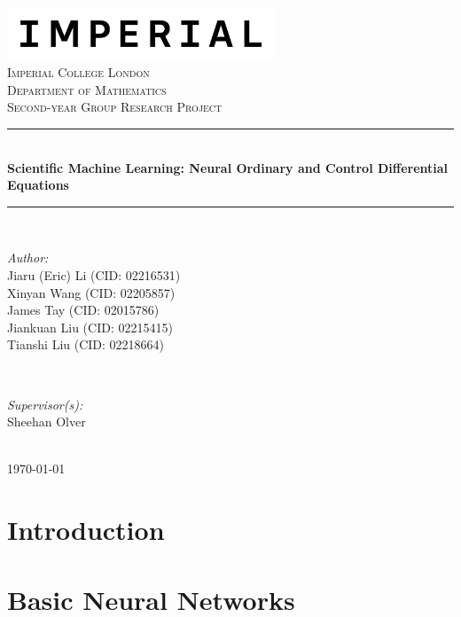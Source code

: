 \documentclass[a4paper,11pt, titlepage]{article}
\theoremstyle{definition}
\theoremstyle{plain}
\theoremstyle{remark}
\newcommand{\reporttitle}{Scientific Machine Learning: Neural Ordinary and Control Differential Equations}
\newcommand{\reportauthorA}{Jiaru (Eric) Li (CID: 02216531)}
\newcommand{\reportauthorB}{Xinyan Wang (CID: 02205857)}
\newcommand{\reportauthorC}{James Tay (CID: 02015786)}
\newcommand{\reportauthorD}{Jiankuan Liu (CID: 02215415)}
\newcommand{\reportauthorE}{Tianshi Liu (CID: 02218664)}
\newcommand{\supervisor}{Sheehan Olver}
\begin{document}
\begin{titlepage}
\newcommand{\HRule}{\rule{\linewidth}{0.5mm}}
\includegraphics[width=8cm]{figures/Imperial_logo.png}\\[1cm]
\center
\textsc{\LARGE Imperial College London}\\[0.5cm] 
\textsc{\Large Department of Mathematics}\\[1.5cm] 
\textsc{\Large Second-year Group Research Project}\\[0.5cm]
\makeatletter
\HRule \\[0.6cm]
{\huge \bfseries \reporttitle}\\[0.6cm]
\HRule \\[1.5cm]
\begin{minipage}{0.4\textwidth}
\begin{flushleft} \large
\emph{Author:}\\
\reportauthorA \\
\reportauthorB \\
\reportauthorC \\
\reportauthorD \\
\reportauthorE
\end{flushleft}
\end{minipage}
~
\begin{minipage}{0.4\textwidth}
\begin{flushright} \large
\emph{Supervisor(s):} \\
\supervisor
\end{flushright}
\end{minipage}\\[2cm]
\makeatother
\vfill
\makeatletter
{\large \today}\\[2cm]
\makeatother
\end{titlepage}

\begin{abstract}

\end{abstract}

\tableofcontents

\section{Introduction}

\section{Basic Neural Networks}
\end{document}
